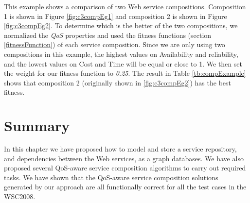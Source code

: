 \begin{exmp}
This example shows a comparison of two Web service compositions. Composition 1 is shown in Figure \ref{fig:c3compEg1} and composition  2 is shown in Figure \ref{fig:c3compEg2}. To determine which is the better of the two compositions, we normalized the \emph{QoS} properties and used the fitness functions (section \ref{fitnessFunction}) of each service composition. Since we are only using two compositions in this example, the highest values on Availability and reliability, and the lowest values on Cost and Time will be equal or close to 1. We then set the weight for our fitness function to \emph{0.25}. The result in Table \ref{tb:compExample} shows that composition 2 (originally shown in \ref{fig:c3compEg2}) has the best fitness.  
\end{exmp}

\section{Summary}
In this chapter we have proposed how to model and store a service repository, and dependencies between the Web services, as a graph databases. We have also proposed several QoS-aware service composition algorithms to carry out required tasks.  We have shown that the QoS-aware service composition solutions generated by our approach are all functionally correct for all the test cases in the WSC2008. 

\begin{table}[h]
\centering
\caption{Comparison of two web service compositions}
\label{tb:compExample}
\end{table}

